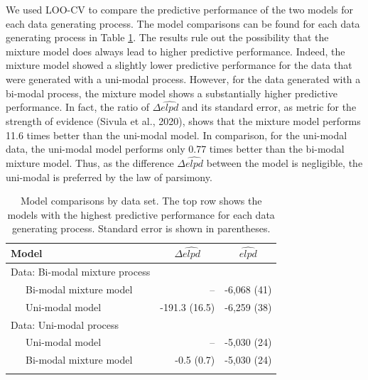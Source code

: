 \begin{appendix}
\begin{table}[tbp]
\begin{center}
\begin{threeparttable}
\end{threeparttable}
\end{center}

\end{table}

We used LOO-CV to compare the predictive performance of the two models
for each data generating process. The model comparisons can be found for
each data generating process in Table \ref{tab:loossim}. The results
rule out the possibility that the mixture model does always lead to
higher predictive performance. Indeed, the mixture model showed a
slightly lower predictive performance for the data that were generated
with a uni-modal process. However, for the data generated with a
bi-modal process, the mixture model shows a substantially higher
predictive performance. In fact, the ratio of \(\Delta\widehat{elpd}\)
and its standard error, as metric for the strength of evidence (Sivula
et al., 2020), shows that the mixture model performs 11.6 times better
than the uni-modal model. In comparison, for the uni-modal data, the
uni-modal model performs only 0.77 times better than the bi-modal
mixture model. Thus, as the difference \(\Delta\widehat{elpd}\) between
the model is negligible, the uni-modal is preferred by the law of
parsimony.

\begin{table}[tbp]

\begin{center}
\begin{threeparttable}

\caption{\label{tab:loossim}Model comparisons by data set. The top row shows the models with the highest predictive performance for each data generating process. Standard error is shown in parentheses.}

\begin{tabular}{lrr}
\toprule
Model & \multicolumn{1}{c}{$\Delta\widehat{elpd}$} & \multicolumn{1}{c}{$\widehat{elpd}$}\\
\midrule
Data: Bi-modal mixture process &  & \\
\ \ \ Bi-modal mixture model & -- & -6,068 (41)\\
\ \ \ Uni-modal model & -191.3 (16.5) & -6,259 (38)\\
Data: Uni-modal process &  & \\
\ \ \ Uni-modal model & -- & -5,030 (24)\\
\ \ \ Bi-modal mixture model & -0.5 (0.7) & -5,030 (24)\\
\bottomrule
\addlinespace
\end{tabular}


\end{threeparttable}
\end{center}
\end{table}
\end{appendix}
